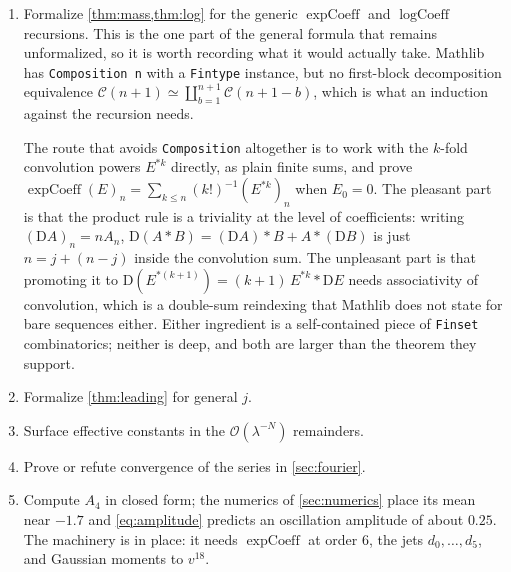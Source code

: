 \documentclass[11pt,oneside]{article}
\theoremstyle{definition}
\theoremstyle{remark}
\newcommand{\bigO}{\mathcal O}
\begin{document}
\begin{enumerate}
\item Formalize \cref{thm:mass,thm:log} for the generic
  $\operatorname{expCoeff}$ and $\operatorname{logCoeff}$ recursions.  This is
  the one part of the general formula that remains unformalized, so it is
  worth recording what it would actually take.  Mathlib has
  \texttt{Composition n} with a \texttt{Fintype} instance, but no first-block
  decomposition equivalence
  $\mathcal C(n+1)\simeq\coprod_{b=1}^{n+1}\mathcal C(n+1-b)$, which is what
  an induction against the recursion needs.

  The route that avoids \texttt{Composition} altogether is to work with the
  $k$-fold convolution powers $E^{*k}$ directly, as plain finite sums, and
  prove $\operatorname{expCoeff}(E)_n=\sum_{k\le n}(k!)^{-1}(E^{*k})_n$ when
  $E_0=0$.  The pleasant part is that the product rule is a triviality at the
  level of coefficients: writing $(\mathrm DA)_n=nA_n$,
  $\mathrm D(A*B)=(\mathrm DA)*B+A*(\mathrm DB)$ is just $n=j+(n-j)$ inside
  the convolution sum.  The unpleasant part is that promoting it to
  $\mathrm D(E^{*(k+1)})=(k+1)\,E^{*k}*\mathrm DE$ needs associativity of
  convolution, which is a double-sum reindexing that Mathlib does not state
  for bare sequences either.  Either ingredient is a self-contained piece of
  \texttt{Finset} combinatorics; neither is deep, and both are larger than the
  theorem they support.
\item Formalize \cref{thm:leading} for general $j$.
\item Surface effective constants in the $\bigO(\lambda^{-N})$ remainders.
\item Prove or refute convergence of the series in \cref{sec:fourier}.
\item Compute $A_4$ in closed form; the numerics of \cref{sec:numerics} place
  its mean near $-1.7$ and \cref{eq:amplitude} predicts an oscillation
  amplitude of about $0.25$.  The machinery is in place: it needs
  $\operatorname{expCoeff}$ at order $6$, the jets $d_0,\dots,d_5$, and
  Gaussian moments to $v^{18}$.
\end{enumerate}
\end{document}
